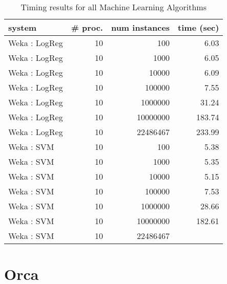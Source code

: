 \begin{table}
\begin{tabular}{|l|r|r|r|}
\hline
 system  &  \# proc.  &  num instances  &  time (sec)  \\
\hline
 Weka : LogReg    &           10  &            100  &        6.03  \\
 Weka : LogReg    &           10  &           1000  &        6.05  \\
 Weka : LogReg    &           10  &          10000  &        6.09  \\
 Weka : LogReg    &           10  &         100000  &        7.55  \\
 Weka : LogReg    &           10  &        1000000  &       31.24  \\
 Weka : LogReg    &           10  &       10000000  &      183.74  \\
 Weka : LogReg    &           10  &       22486467  &      233.99  \\
\hline
 Weka : SVM     &           10  &            100  &        5.38  \\
 Weka : SVM     &           10  &           1000  &        5.35  \\
 Weka : SVM     &           10  &          10000  &        5.15  \\
 Weka : SVM     &           10  &         100000  &        7.53  \\
 Weka : SVM     &           10  &        1000000  &       28.66  \\
 Weka : SVM     &           10  &       10000000  &      182.61  \\
 Weka : SVM     &           10  &       22486467  &      	  \\
\hline
\end{tabular}
\caption{Timing results for all Machine Learning Algorithms}
\label{table:machineLearningTiming2}
\end{table}


\section{Orca}

